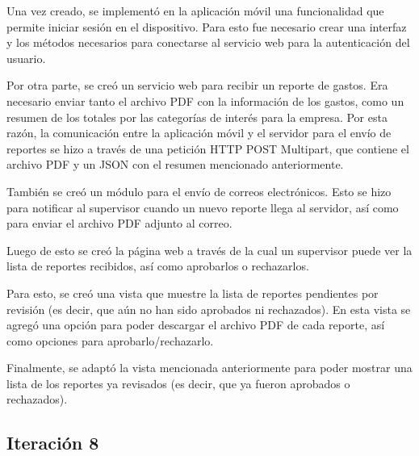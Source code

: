Una vez creado, se implementó en la aplicación móvil una funcionalidad que permite iniciar sesión en el dispositivo. Para esto fue necesario crear una interfaz y los métodos necesarios para conectarse al servicio web para la autenticación del usuario.

Por otra parte, se creó un servicio web para recibir un reporte de gastos. Era necesario enviar tanto el archivo PDF con la información de los gastos, como un resumen de los totales por las categorías de interés para la empresa. Por esta razón, la comunicación entre la aplicación móvil y el servidor para el envío de reportes se hizo a través de una petición HTTP POST Multipart, que contiene el archivo PDF y un JSON con el resumen mencionado anteriormente.

También se creó un módulo para el envío de correos electrónicos. Esto se hizo para notificar al supervisor cuando un nuevo reporte llega al servidor, así como para enviar el archivo PDF adjunto al correo.

Luego de esto se creó la página web a través de la cual un supervisor puede ver la lista de reportes recibidos, así como aprobarlos o rechazarlos.

Para esto, se creó una vista que muestre la lista de reportes pendientes por revisión (es decir, que aún no han sido aprobados ni rechazados). En esta vista se agregó una opción para poder descargar el archivo PDF de cada reporte, así como opciones para aprobarlo/rechazarlo.

Finalmente, se adaptó la vista mencionada anteriormente para poder mostrar una lista de los reportes ya revisados (es decir, que ya fueron aprobados o rechazados).

\subsection{Iteración 8}